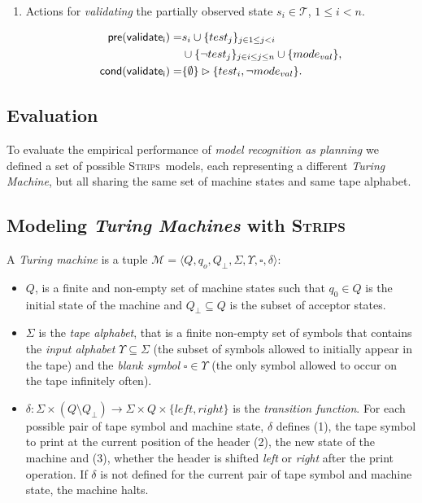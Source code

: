 \documentclass[letterpaper]{article} %
\newcommand{\tup}[1]{{\langle #1 \rangle}}
\newcommand{\pre}{\mathsf{pre}}     %
\newcommand{\cond}{\mathsf{cond}}   %
\newcommand{\strips}{\textsc{Strips}}     %
\begin{document}
\begin{itemize}
\begin{enumerate}
\item Actions for {\em validating} the partially observed state $s_i\in\mathcal{T}$, {\tt\small $1\leq i< n$}.
\begin{small}
\begin{align*}
\hspace*{7pt}\pre(\mathsf{validate_{i}})=&s_i\cup\{test_j\}_{j\in 1\leq j<i}\\
&\cup\{\neg test_j\}_{j\in i\leq j\leq n}\cup \{mode_{val}\},\\
\cond(\mathsf{validate_{i}})=&\{\emptyset\}\rhd\{test_i,\neg mode_{val}\}.
\end{align*}
\end{small}
\end{enumerate}
\end{itemize}


\subsection{Evaluation}
\label{sec:evaluation}
To evaluate the empirical performance of {\em model recognition as planning} we defined a set of possible \strips\ models, each representing a different {\em Turing Machine}, but all sharing the same set of machine states and same tape alphabet.

\subsection{Modeling {\em Turing Machines} with \strips\ }
A {\em Turing machine} is a tuple $\mathcal{M}=\tup{Q,q_o,Q_{\bot},\Sigma,\Upsilon,\square,\delta}$:
\begin{itemize}
\item $Q$, is a finite and non-empty set of machine states such that $q_0\in Q$ is the initial state of the machine and $Q_{\bot}\subseteq Q$ is the subset of acceptor states.  
\item $\Sigma$ is the {\em tape alphabet}, that is a finite non-empty set of symbols that contains the {\em input alphabet} $\Upsilon\subseteq\Sigma$ (the subset of symbols allowed to initially appear in the tape) and the {\em blank symbol} $\square\in\Upsilon$ (the only symbol allowed to occur on the tape infinitely often).
\item $\delta: \Sigma\times (Q\setminus Q_{\bot}) \rightarrow \Sigma\times Q\times\{left,right\}$ is the {\em transition function}. For each possible pair of tape symbol and machine state, $\delta$ defines (1), the tape symbol to print at the current position of the header (2), the new state of the machine and (3), whether the header is shifted {\em left} or {\em right} after the print operation. If $\delta$ is not defined for the current pair of tape symbol and machine state, the machine halts.
\end{itemize}
\end{document}

